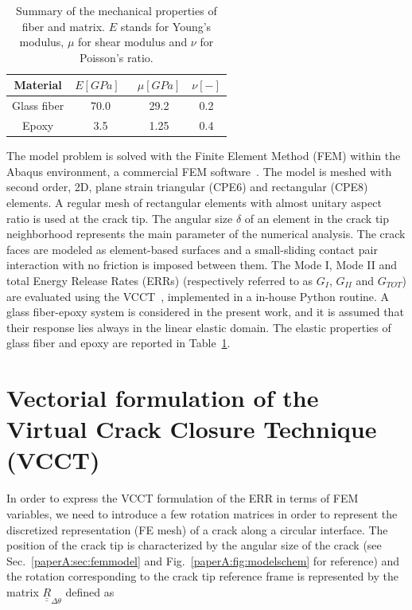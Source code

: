 \begin{table}[!htbp]
 \centering
 \caption{Summary of the mechanical properties of fiber and matrix. $E$ stands for Young's modulus, $\mu$ for shear modulus and $\nu$ for Poisson's ratio.}
 \begin{tabular}{cccc}
\textbf{Material} & \textbf{$E\left[GPa\right]$}\ & \textbf{$\mu\left[GPa\right]$} & \textbf{$\nu\left[-\right]$} \\
\midrule
Glass fiber    & 70.0  & 29.2   & 0.2  \\
Epoxy    & 3.5    & 1.25   & 0.4
\end{tabular}
\label{paperA:tab:phaseprop}
\end{table}

The model problem is solved with the Finite Element Method (FEM) within the Abaqus environment, a commercial FEM software~\cite{abq12}. The model is meshed with second order, 2D, plane strain triangular (CPE6) and rectangular (CPE8) elements. A regular mesh of rectangular elements with almost unitary aspect ratio is used at the crack tip. The angular size $\delta$ of an element in the crack tip neighborhood represents the main parameter of the numerical analysis. The crack faces are modeled as element-based surfaces and a small-sliding contact pair interaction with no friction is imposed between them. The Mode I, Mode II and total Energy Release Rates (ERRs) (respectively referred to as $G_{I}$, $G_{II}$ and $G_{TOT}$) are evaluated using the VCCT~\cite{Krueger2004}, implemented in a in-house Python routine. A glass fiber-epoxy system is considered in the present work, and it is assumed that their response lies always in the linear elastic domain. The elastic properties of glass fiber and epoxy are reported in Table~\ref{paperA:tab:phaseprop}.

\section{Vectorial formulation of the Virtual Crack Closure Technique (VCCT)}

In order to express the VCCT formulation of the ERR in terms of FEM variables, we need to introduce a few rotation matrices in order to represent the discretized representation (FE mesh) of a crack along a circular interface. The position of the crack tip is characterized by the angular size of the crack (see Sec.~\ref{paperA:sec:femmodel} and Fig.~\ref{paperA:fig:modelschem} for reference) and the rotation corresponding to the crack tip reference frame is represented by the matrix $\underline{\underline{R}}_{\Delta\theta}$ defined as

